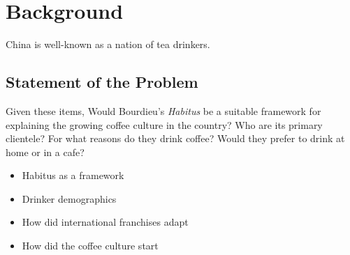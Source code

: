 \section{Background}\label{sec:background}

China is well-known as a nation of tea drinkers.

\subsection{Statement of the Problem}

Given these items, Would Bourdieu's \emph{Habitus} be a suitable framework for
explaining the growing coffee culture in the country? Who are its primary
clientele? For what reasons do they drink coffee? Would they prefer to drink at
home or in a cafe?

\begin{itemize}
	\item Habitus as a framework
	\item Drinker demographics
	\item How did international franchises adapt
	\item How did the coffee culture start
\end{itemize}
